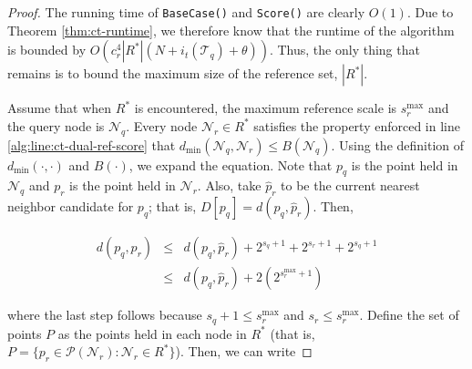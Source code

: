 \begin{proof}
The running time of \texttt{BaseCase()} and \texttt{Score()} are clearly $O(1)$.
Due to Theorem \ref{thm:ct-runtime}, we therefore know that the runtime of the
algorithm is bounded by $O(c_r^4 |R^*| (N + i_t(\mathscr{T}_q) + \theta))$.
Thus, the only thing that remains is to bound the maximum size of the reference
set, $|R^*|$.

Assume that when $R^*$ is encountered, the maximum reference scale is
$s_r^{\max}$ and the query node is $\mathscr{N}_q$.  Every node $\mathscr{N}_r
\in R^*$ satisfies the property enforced in line
\ref{alg:line:ct-dual-ref-score} that
$d_{\min}(\mathscr{N}_q, \mathscr{N}_r) \le B(\mathscr{N}_q)$.
Using the definition of $d_{\min}(\cdot, \cdot)$ and $B(\cdot)$, we
expand the equation.  Note that $p_q$ is the point held in $\mathscr{N}_q$ and
$p_r$ is the point held in $\mathscr{N}_r$.  Also, take $\hat{p}_r$ to be the
current nearest neighbor candidate for $p_q$; that is, $D[p_q] = d(p_q,
\hat{p}_r)$.  Then,

\begin{eqnarray}
d(p_q, p_r) &\le& d(p_q, \hat{p}_r) + 2^{s_q + 1} + 2^{s_r + 1} + 2^{s_q + 1}
\label{eqn:pr_dist} \\
 &\le& d(p_q, \hat{p}_r) + 2(2^{s_r^{\max} + 1})
\end{eqnarray}

\noindent where the last step follows because $s_q + 1 \le s_r^{\max}$ and $s_r
\le s_r^{\max}$.  Define the set of points $P$ as the points held in each node
in $R^*$ (that is, $P = \{ p_r \in \mathscr{P}(\mathscr{N}_r) : \mathscr{N}_r
\in R^* \}$).  Then, we can write

%


\end{proof}
